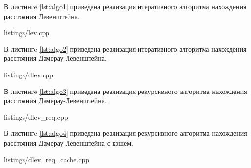 В листингe \ref{lst:algo1} приведена реализация итеративного алгоритма нахождения расстояния Левенштейна.


\begin{lstinputlisting}[
	caption={Итеративный алгоритм нахождения расстояния Левенштейна},
	label={lst:algo1}
	]{listings/lev.cpp}
\end{lstinputlisting}

\newpage
В листингe \ref{lst:algo2} приведена реализация итеративного алгоритма нахождения расстояния Дамерау-Левенштейна.

\begin{lstinputlisting}[
	caption={Итеративный алгоритм нахождения расстояния Дамерау-Левенштейна},
	label={lst:algo2}
	]{listings/dlev.cpp}
\end{lstinputlisting}

\newpage
В листингe \ref{lst:algo3} приведена реализация рекурсивного алгоритма нахождения расстояния Дамерау-Левенштейна.

\begin{lstinputlisting}[
	caption={Рекурсивный алгоритм нахождения расстояния Дамерау-Левенштейна},
	label={lst:algo3}
	]{listings/dlev_req.cpp}
\end{lstinputlisting}

\newpage
В листингe \ref{lst:algo4} приведена реализация рекурсивного алгоритма нахождения расстояния Дамерау-Левенштейна с кэшем.

\begin{lstinputlisting}[
	caption={Рекурсивный алгоритм нахождения расстояния Дамерау-Левенштейна с кэшем},
	label={lst:algo4}
	]{listings/dlev_req_cache.cpp}
\end{lstinputlisting}